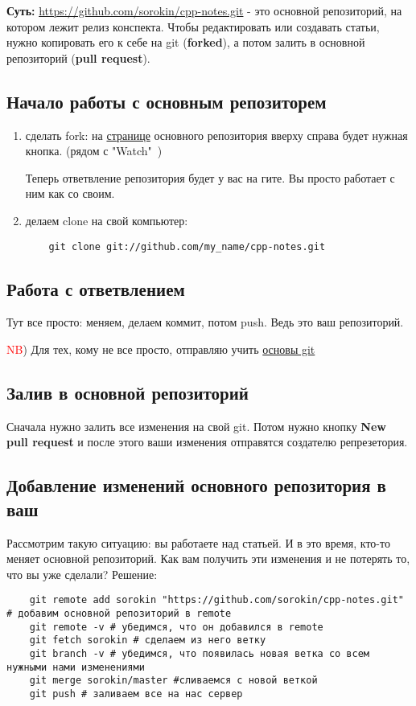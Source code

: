 \documentclass[12pt]{article}
\begin{document}
{\bf Суть:} \url{https://github.com/sorokin/cpp-notes.git} - это основной репозиторий, на котором лежит релиз конспекта. Чтобы редактировать или создавать статьи, нужно копировать его к себе на git ({\bf forked}), а потом залить в основной репозиторий ({\bf pull request}).
	\subsection{Начало работы с основным репозиторем}
	\begin{enumerate}
	\item сделать fork: на \href{https://github.com/sorokin/cpp-notes}{странице} основного репозитория  вверху справа будет нужная кнопка. (рядом с "Watch"\ )


	Теперь ответвление репозитория будет у вас на гите. Вы просто работает с ним как со своим.
	\item делаем clone на свой компьютер:
	\begin{verbatim}
	git clone git://github.com/my_name/cpp-notes.git
	\end{verbatim}
	\end{enumerate}
	\subsection{Работа с ответвлением}
	 Тут все просто: меняем, делаем коммит, потом push. Ведь это ваш репозиторий.


	\textcolor{red}{NB}) Для тех, кому не все просто, отправляю учить \href{https://git-scm.com/book/ru/v1}{основы git}
	\subsection{Залив в основной репозиторий}
	Сначала нужно залить все изменения на свой git. Потом нужно кнопку \textbf{New pull request} и после этого ваши изменения отправятся создателю репрезетория.

	\subsection{Добавление изменений основного репозитория в ваш}
	Рассмотрим такую ситуацию: вы работаете над статьей. И в это время, кто-то меняет основной репозиторий. Как вам получить эти изменения и не потерять то, что вы уже сделали?
	Решение:
	\begin{verbatim}
	git remote add sorokin "https://github.com/sorokin/cpp-notes.git" # добавим основной репозиторий в remote
	git remote -v # убедимся, что он добавился в remote
	git fetch sorokin # сделаем из него ветку
	git branch -v # убедимся, что появилась новая ветка со всем нужными нами изменениями
	git merge sorokin/master #сливаемся с новой веткой
	git push # заливаем все на нас сервер
	\end{verbatim}
\end{document}
